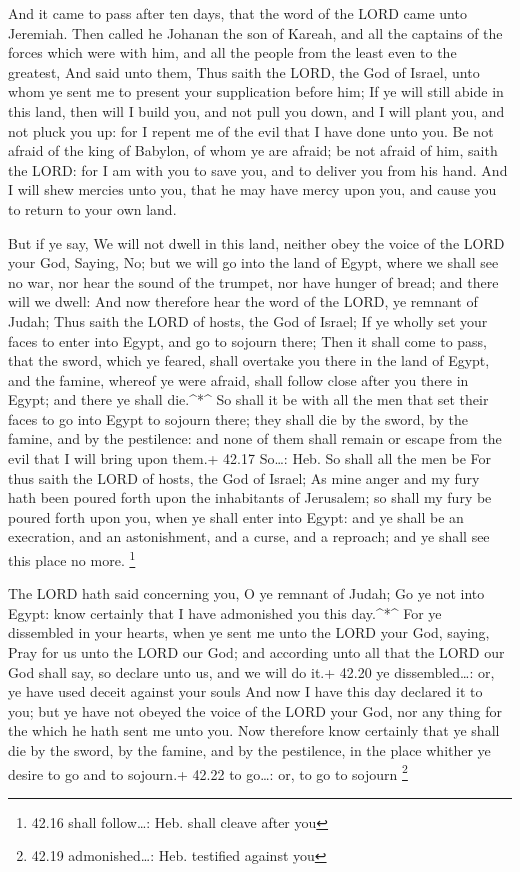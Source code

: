  And it came to pass after ten days, that the word of the
LORD came unto Jeremiah.  Then called he Johanan the son of
Kareah, and all the captains of the forces which were with him, and all
the people from the least even to the greatest,  And said
unto them, Thus saith the LORD, the God of Israel, unto whom ye sent me
to present your supplication before him;  If ye will still
abide in this land, then will I build you, and not pull you down, and I
will plant you, and not pluck you up: for I repent me of the evil that I
have done unto you.  Be not afraid of the king of Babylon,
of whom ye are afraid; be not afraid of him, saith the LORD: for I am
with you to save you, and to deliver you from his hand. 
And I will shew mercies unto you, that he may have mercy upon you, and
cause you to return to your own land.

 But if ye say, We will not dwell in this land, neither
obey the voice of the LORD your God,  Saying, No; but we
will go into the land of Egypt, where we shall see no war, nor hear the
sound of the trumpet, nor have hunger of bread; and there will we dwell:
 And now therefore hear the word of the LORD, ye remnant of
Judah; Thus saith the LORD of hosts, the God of Israel; If ye wholly set
your faces to enter into Egypt, and go to sojourn there; 
Then it shall come to pass, that the sword, which ye feared, shall
overtake you there in the land of Egypt, and the famine, whereof ye were
afraid, shall follow close after you there in Egypt; and there ye shall
die.\^{}*\^{}  So shall it be with all the men that set
their faces to go into Egypt to sojourn there; they shall die by the
sword, by the famine, and by the pestilence: and none of them shall
remain or escape from the evil that I will bring upon them.+ 42.17
So\ldots: Heb. So shall all the men be  For thus saith the
LORD of hosts, the God of Israel; As mine anger and my fury hath been
poured forth upon the inhabitants of Jerusalem; so shall my fury be
poured forth upon you, when ye shall enter into Egypt: and ye shall be
an execration, and an astonishment, and a curse, and a reproach; and ye
shall see this place no more. \footnote{42.16 shall follow\ldots: Heb.
  shall cleave after you}

 The LORD hath said concerning you, O ye remnant of Judah;
Go ye not into Egypt: know certainly that I have admonished you this
day.\^{}*\^{}  For ye dissembled in your hearts, when ye
sent me unto the LORD your God, saying, Pray for us unto the LORD our
God; and according unto all that the LORD our God shall say, so declare
unto us, and we will do it.+ 42.20 ye dissembled\ldots: or, ye have used
deceit against your souls  And now I have this day declared
it to you; but ye have not obeyed the voice of the LORD your God, nor
any thing for the which he hath sent me unto you.  Now
therefore know certainly that ye shall die by the sword, by the famine,
and by the pestilence, in the place whither ye desire to go and to
sojourn.+ 42.22 to go\ldots: or, to go to sojourn \footnote{42.19
  admonished\ldots: Heb. testified against you}

